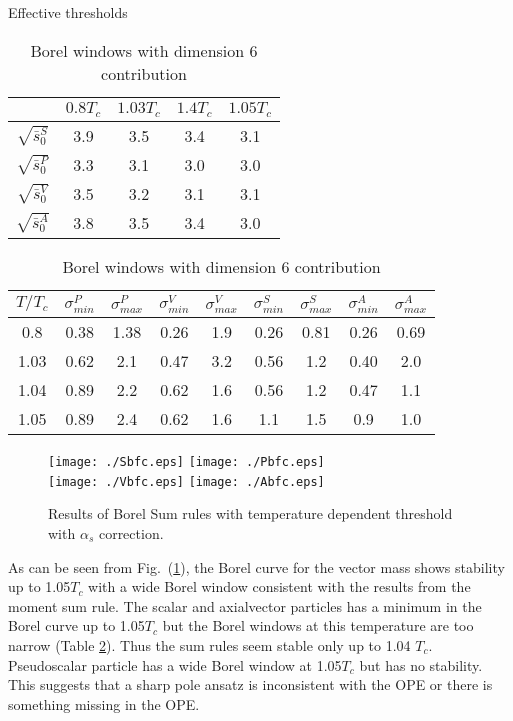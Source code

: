 \documentclass[aps,prc,superscriptaddress,showpacs,floatfix, nofootinbib,preprintnumbers,twocolumn]{revtex4}
\begin{document}
\begin{table}[h]
\caption{Effective thresholds}
\label{table:eff-threshold}
\centering
\begin{tabular}{ |c|c|c|c|c| }
 \hline
         & $0.8T_c$ & $1.03T_c$& $1.4T_c$ &$1.05T_c$\\
 \hline
 $\sqrt{\bar{s}_0^S}$& 3.9 & 3.5&3.4&3.1 \\ 
 \hline
 $\sqrt{\bar{s}_0^P}$&3.3 & 3.1&3.0&3.0 \\ 
 \hline
  $\sqrt{\bar{s}_0^V}$&3.5 & 3.2&3.1&3.1 \\ 
 \hline
  $\sqrt{\bar{s}_0^A}$& 3.8 & 3.5&3.4&3.0 \\ 
 \hline
\end{tabular}
\caption{Borel windows with dimension 6 contribution}
\label{table:borelwindow}
\centering
\begin{tabular}{ |c|c c|c c|c c|c c| }
 \hline
 $T/T_c$&$\sigma^{P}_{min}$&$\sigma^{P}_{max}$&$\sigma^{V}_{min}$&$\sigma^{V}_{max}$&$\sigma^{S}_{min}$&$\sigma^{S}_{max}$&$\sigma^{A}_{min}$&$\sigma^{A}_{max}$\\
 \hline
 0.8&0.38&1.38&0.26&1.9&0.26&0.81&0.26&0.69\\
 \hline
1.03&0.62&2.1&0.47&3.2&0.56&1.2&0.40&2.0\\
\hline
1.04&0.89&2.2&0.62&1.6&0.56&1.2&0.47&1.1\\
\hline
1.05&0.89&2.4&0.62&1.6&1.1&1.5&0.9&1.0\\
\hline
\end{tabular}
\label{borelwindow}
\end{table}

\begin{figure}[h]
  \centering
  \texttt{[image: ./Sbfc.eps]}
  \texttt{[image: ./Pbfc.eps]}\\
  \texttt{[image: ./Vbfc.eps]}
  \texttt{[image: ./Abfc.eps]}\\
  \caption{Results of Borel Sum rules with temperature dependent threshold with  $\alpha_s$ correction.}
  \label{borel}
\end{figure}

As can be seen from Fig.~(\ref{borel}), the Borel curve for the vector mass shows stability up to 1.05$T_c$ with a wide Borel window consistent with the results from the moment sum rule. The scalar and axialvector particles has a minimum in the Borel curve up to 1.05$T_c$ but the Borel windows at this temperature are too narrow (Table \ref{borelwindow}).  Thus the sum rules seem stable only up to 1.04 $T_c$. Pseudoscalar particle has a wide Borel window at 1.05$T_c$ but has no stability.  This suggests that a sharp pole ansatz is inconsistent with the OPE or there is something missing in the OPE.  
\end{document}
